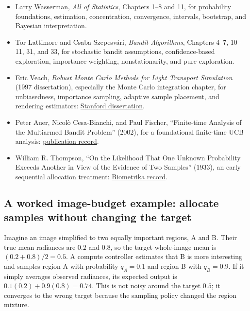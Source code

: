 \begin{itemize}
\tightlist
\item
  Larry Wasserman, \emph{All of Statistics}, Chapters 1--8 and 11, for probability foundations, estimation, concentration, convergence, intervals, bootstrap, and Bayesian interpretation.
\item
  Tor Lattimore and Csaba Szepesvári, \emph{Bandit Algorithms}, Chapters 4--7, 10--11, 31, and 33, for stochastic bandit assumptions, confidence-based exploration, importance weighting, nonstationarity, and pure exploration.
\item
  Eric Veach, \emph{Robust Monte Carlo Methods for Light Transport Simulation} (1997 dissertation), especially the Monte Carlo integration chapter, for unbiasedness, importance sampling, adaptive sample placement, and rendering estimators: \href{https://graphics.stanford.edu/papers/veach_thesis/}{Stanford dissertation}.
\item
  Peter Auer, Nicolò Cesa-Bianchi, and Paul Fischer, ``Finite-time Analysis of the Multiarmed Bandit Problem'' (2002), for a foundational finite-time UCB analysis: \href{https://www2.compute.dtu.dk/pubdb/pubs/2088-full.html}{publication record}.
\item
  William R. Thompson, ``On the Likelihood That One Unknown Probability Exceeds Another in View of the Evidence of Two Samples'' (1933), an early sequential allocation treatment: \href{https://academic.oup.com/biomet/article-abstract/25/3-4/285/200862}{Biometrika record}.
\end{itemize}

\subsection{A worked image-budget example: allocate samples without changing the target}\label{02-foundations-ii-ch029-a-worked-image-budget-example-allocate-samples-without-changing-the-target}

Imagine an image simplified to two equally important regions, A and B. Their true mean radiances are \(0.2\) and \(0.8\), so the target whole-image mean is \((0.2+0.8)/2=0.5\). A compute controller estimates that B is more interesting and samples region A with probability \(q_A=0.1\) and region B with \(q_B=0.9\). If it simply averages observed radiances, its expected output is \(0.1(0.2)+0.9(0.8)=0.74\). This is not noisy around the target \(0.5\); it converges to the wrong target because the sampling policy changed the region mixture.

